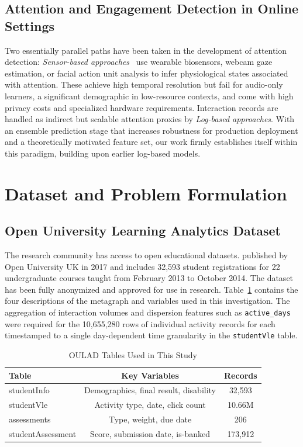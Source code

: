 \documentclass[conference]{IEEEtran}
\begin{document}
\subsection{Attention and Engagement Detection in Online Settings}
Two essentially parallel paths have been taken in the development of attention detection: \textit{Sensor-based approaches}~\cite{ref_gaze} use wearable biosensors, webcam gaze estimation, or facial action unit analysis to infer physiological states associated with attention. These achieve high temporal resolution but fail for audio-only learners, a significant demographic in low-resource contexts, and come with high privacy costs and specialized hardware requirements.
\LMS Interaction records are handled as indirect but scalable attention proxies by \textit{Log-based approaches}. With an ensemble prediction stage that increases robustness for production deployment and a theoretically motivated feature set, our work firmly establishes itself within this paradigm, building upon earlier log-based models.
\section{Dataset and Problem Formulation}
\label{sec:data}

\subsection{Open University Learning Analytics Dataset}

The research community has access to open educational datasets. published by Open University UK in 2017 and includes 32,593 student registrations for 22 undergraduate courses taught from February 2013 to October 2014. The dataset has been fully anonymized and approved for use in research. Table~\ref{tab:data} contains the four descriptions of the metagraph and variables used in this investigation. The aggregation of interaction volumes and dispersion features such as \texttt{active\_days} were required for the 10,655,280 rows of individual activity records for each timestamped to a single day-dependent time granularity in the \texttt{studentVle} table.

\begin{table}[htbp]
\centering
\caption{OULAD Tables Used in This Study}
\label{tab:data}
\begin{tabular}{>{\ttfamily}lcc}
\toprule
\normalfont\textbf{Table} & \textbf{Key Variables} & \textbf{Records} \\
\midrule
studentInfo       & Demographics, final result, disability & 32,593  \\
studentVle        & Activity type, date, click count       & 10.66M  \\
assessments       & Type, weight, due date                 & 206     \\
studentAssessment & Score, submission date, is-banked      & 173,912 \\
\bottomrule
\end{tabular}
\end{table}
\end{document}
